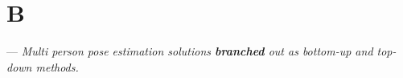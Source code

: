 \section{B}

 --- \textit{Multi person pose estimation solutions \textbf{branched} out as bottom-up and top-down methods.} 
